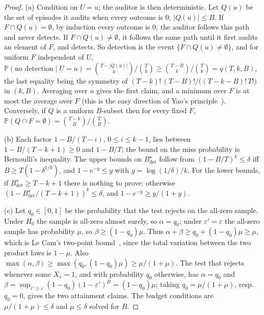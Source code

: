\documentclass[11pt,a4paper]{article}
\newcommand{\Prob}{\mathbb{P}}
\begin{document}
\begin{proof}
(a) Condition on $U=u$; the auditor is then deterministic. Let $Q(u)$ be the
set of episodes it audits when every outcome is $0$; $|Q(u)|\le B$. If
$F\cap Q(u)=\emptyset$, by induction every outcome is $0$, the auditor follows
this path and never detects. If $F\cap Q(u)\ne\emptyset$, it follows the same
path until it first audits an element of $F$, and detects. So detection is the
event $\{F\cap Q(u)\neq\emptyset\}$, and for uniform $F$ independent of $U$,
$\Prob(\text{no detection}\mid U=u)=\binom{T-|Q(u)|}{k}/\binom Tk\ge
\binom{T-B}{k}/\binom Tk=q(T,k,B)$, the last equality being the symmetry of
$(T-k)!\,(T-B)!/\bigl((T-k-B)!\,T!\bigr)$ in $(k,B)$. Averaging over $u$ gives the first
claim, and a minimum over $F$ is at most the average over $F$ (this is the easy
direction of Yao's principle~\cite{yao1977probabilistic}). Conversely, if $Q$ is
a uniform $B$-subset then for every fixed $F$,
$\Prob(Q\cap F=\emptyset)=\binom{T-k}{B}/\binom TB$.

(b) Each factor $1-B/(T-i)$, $0\le i\le k-1$, lies between $1-B/(T-k+1)\ge0$
and $1-B/T$; the bound on the miss probability is Bernoulli's inequality. The
upper bounds on $B^\star_{\mathrm{det}}$ follow from $(1-B/T)^k\le\delta$ iff
$B\ge T(1-\delta^{1/k})$, and $1-e^{-y}\le y$ with $y=\log(1/\delta)/k$. For the
lower bounds, if $B^\star_{\mathrm{det}}\ge T-k+1$ there is nothing to prove;
otherwise $(1-B^\star_{\mathrm{det}}/(T-k+1))^k\le\delta$, and
$1-e^{-y}\ge y/(1+y)$.

(c) Let $q_0\in[0,1]$ be the probability that the test rejects on the all-zero
sample. Under $H_0$ the sample is all-zero almost surely, so $\alpha=q_0$; under
$\varepsilon'=\varepsilon$ the all-zero sample has probability $\mu$, so
$\beta\ge(1-q_0)\mu$. Thus $\alpha+\beta\ge q_0+(1-q_0)\mu\ge\mu$, which is Le
Cam's two-point bound~\cite{lecam1973convergence,yu1997assouad}, since the total
variation between the two product laws is $1-\mu$. Also
$\max(\alpha,\beta)\ge\max(q_0,(1-q_0)\mu)\ge\mu/(1+\mu)$. The test that rejects
whenever some $X_s=1$, and with probability $q_0$ otherwise, has $\alpha=q_0$
and $\beta=\sup_{\varepsilon'\ge\varepsilon}(1-q_0)(1-\varepsilon')^B=(1-q_0)\mu$;
taking $q_0=\mu/(1+\mu)$, resp.\ $q_0=0$, gives the two attainment claims. The
budget conditions are $\mu/(1+\mu)\le\delta$ and $\mu\le\delta$ solved for $B$.
\end{proof}
\end{document}
